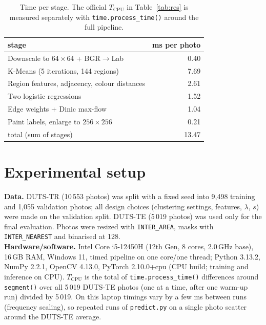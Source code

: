 \documentclass[11pt,a4paper]{article}
\begin{document}
\begin{table}[h]\centering\small
\begin{tabular}{lr}\toprule stage & ms per photo \\\midrule
Downscale to $64{\times}64$ + BGR$\to$Lab & 0.40 \\
K-Means (5 iterations, 144 regions) & 7.69 \\
Region features, adjacency, colour distances & 2.61 \\
Two logistic regressions & 1.52 \\
Edge weights + Dinic max-flow & 1.04 \\
Paint labels, enlarge to $256{\times}256$ & 0.21 \\
\midrule total (sum of stages) & 13.47 \\\bottomrule\end{tabular}
\caption{Time per stage. The official $T_\mathrm{CPU}$ in Table~\ref{tab:res} is measured separately with \texttt{time.process\_time()} around the full pipeline.}\label{tab:stages}\end{table}

\section{Experimental setup}
\textbf{Data.} DUTS-TR (10\,553 photos) was split with a fixed seed into 9,498 training and 1,055 validation photos; all design choices (clustering settings, features, $\lambda$, $s$) were made on the validation split.
DUTS-TE (5\,019 photos) was used only for the final evaluation. Photos were resized with \texttt{INTER\_AREA}, masks with \texttt{INTER\_NEAREST} and binarised at 128.\\
\textbf{Hardware/software.} Intel Core i5-12450H (12th Gen, 8 cores, 2.0\,GHz base), 16\,GB RAM, Windows 11, timed pipeline on one core/one thread; Python 3.13.2, NumPy 2.2.1, OpenCV 4.13.0, PyTorch 2.10.0+cpu (CPU build; training and inference on CPU).
$T_\mathrm{CPU}$ is the total of \texttt{time.process\_time()} differences around \texttt{segment()} over all 5\,019 DUTS-TE photos (one at a time, after one warm-up run) divided by 5\,019.
On this laptop timings vary by a few ms between runs (frequency scaling), so repeated runs of \texttt{predict.py} on a single photo scatter around the DUTS-TE average.
\end{document}
